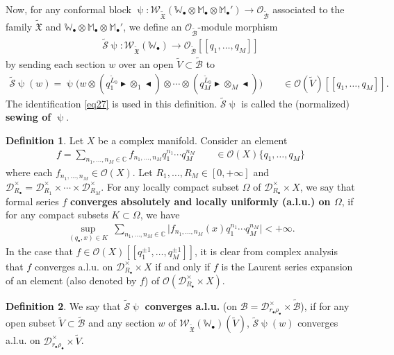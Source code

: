 \documentclass[12pt,a4paper,notitlepage]{article}
\theoremstyle{definition}
\newtheorem{df}{Definition}[section]
\theoremstyle{plain}
\newcommand{\fk}{\mathfrak}
\newcommand{\mc}{\mathcal}
\newcommand{\wtd}{\widetilde}
\newcommand{\scr}{\mathscr}
\newcommand{\blt}{\bullet}
\newcommand{\Wbb}{\mathbb W}
\newcommand{\Mbb}{\mathbb M}
\newcommand{\Cbb}{\mathbb C}
\newcommand{\btl}{\blacktriangleleft}
\newcommand{\btr}{\blacktriangleright}
\numberwithin{equation}{section}
\begin{document}
Now, for any conformal block $\uppsi:\scr W_{\wtd{\fk X}}(\Wbb_\blt\otimes\Mbb_\blt\otimes\Mbb_\blt')\rightarrow\scr O_{\wtd{\mc B}}$ associated to the family $\wtd{\fk X}$ and $\Wbb_\blt\otimes\Mbb_\blt\otimes\Mbb_\blt'$, we define an $\scr O_{\wtd{\mc B}}$-module morphism \index{S@$\wtd{\mc S}\uppsi$}
\begin{gather*}
\wtd{\mc S}\uppsi:\scr W_{\wtd{\fk X}}(\Wbb_\blt)\rightarrow\scr O_{\wtd{\mc B}}[[q_1,\dots,q_M]]
\end{gather*}
by sending each section $w$ over an open $\wtd V\subset\wtd{\mc B}$ to 
\begin{align}
\wtd{\mc S}\uppsi(w)=\uppsi\Big(w\otimes (q_1^{\wtd  L_0}\btr\otimes_1\btl)\otimes\cdots\otimes (q_M^{\wtd  L_0}\btr\otimes_M\btl)\Big)\qquad\in\scr O(\wtd V)[[q_1,\dots,q_M]].
\end{align}
The identification \eqref{eq27} is used in this definition. $\wtd{\mc S}\uppsi$ is called the (normalized) \textbf{sewing of $\uppsi$}.





	
\begin{df}\label{lb19}
Let $X$ be a complex manifold. Consider an element
\begin{align*}
f=\sum_{n_1,\dots,n_M\in\Cbb} f_{n_1,\dots,n_M}q_1^{n_1}\cdots q_M^{n_M}	\qquad\in\scr O(X)\{q_1,\dots,q_M\}
\end{align*}
where each $f_{n_1,\dots,n_M}\in\scr O(X)$. Let $R_1,\dots,R_M\in[0,+\infty]$ and $\mc D_{R_\blt}^\times=\mc D_{R_1}^\times\times\cdots\times\mc D_{R_M}^\times$. For any locally compact subset $\Omega$ of $\mc D_{R_\blt}^\times\times X$, we say that formal series $f$ \textbf{converges absolutely and locally uniformly (a.l.u.)  on $\Omega$}, if for any compact subsets $K\subset\Omega$, we have
\begin{align*}
\sup_{(q_\blt,x)\in K}~\sum_{n_1,\dots,n_M\in\Cbb} \big|f_{n_1,\dots,n_M}(x)q_1^{n_1}\cdots q_M^{n_M}	\big| <+\infty.
\end{align*}  
In the case that $f\in\scr O(X)[[q_1^{\pm 1},\dots,q_M^{\pm 1}]]$, it is clear from complex analysis that $f$ converges a.l.u. on $\mc D_{R_\blt}^\times\times X$ if and only if $f$ is the Laurent series expansion of an element (also denoted by $f$) of $\scr O(\mc D_{R_\blt}^\times\times X)$.
\end{df}

\begin{df}
We say that $\wtd{\mc S}\uppsi$ \textbf{converges a.l.u.} (on $\mc B=\mc D_{r_\blt\rho_\blt}^\times\times\wtd{\mc B}$), if for any open subset $\wtd V\subset\wtd{\mc B}$ and any section $w$ of $\scr W_{\wtd{\fk X}}(\Wbb_\blt)(\wtd V)$, $\wtd{\mc S}\uppsi(w)$  converges a.l.u. on $\mc D_{r_\blt\rho_\blt}^\times\times\wtd V$.
\end{df}
\end{document}
